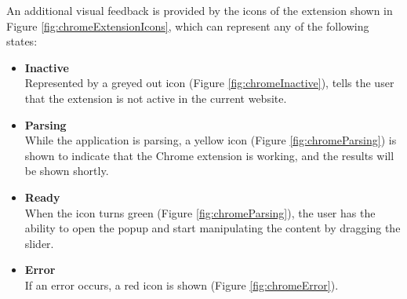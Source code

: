 An additional visual feedback is provided by the icons of the extension shown in Figure \ref{fig:chromeExtensionIcons}, which can represent any of the following states:
\begin{itemize}
\item \textbf{Inactive}\\
Represented by a greyed out icon (Figure \ref{fig:chromeInactive}), tells the user that the extension is not active in the current website.
\item \textbf{Parsing}\\
While the application is parsing, a yellow icon (Figure \ref{fig:chromeParsing}) is shown to indicate that the Chrome extension is working, and the results will be shown shortly.
\item \textbf{Ready}\\
When the icon turns green (Figure \ref{fig:chromeParsing}), the user has the ability to open the popup and start manipulating the content by dragging the slider.
\item \textbf{Error}\\
If an error occurs, a red icon is shown (Figure \ref{fig:chromeError}). 
\end{itemize}
\newcommand{\figureScale}{0.15}
